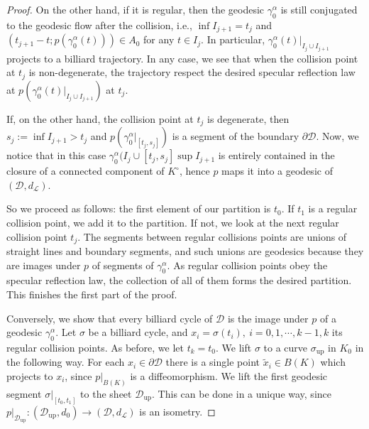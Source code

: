 \documentclass[reqno,11pt]{amsart}
\begin{document}
\begin{proof}
    On the other hand, if it is regular, then the geodesic \( \gamma^\alpha_0 \) is still conjugated to the geodesic flow after the collision, i.e., \(\inf I_{j+1} = t_j \) and \( (t_{j+1}-t; p(\gamma^\alpha_0(t))) \in A_0 \) for any \( t\in I_j \).
    In particular, \( \gamma^\alpha_0(t)\rvert_{I_j \cup I_{j+1}} \) projects to a billiard trajectory.
    In any case, we see that when the collision point at \(t_j\) is non-degenerate, the trajectory respect the desired specular reflection law at \( p(\gamma^\alpha_0(t)\rvert_{I_j \cup I_{j+1}}) \) at \(t_j\).
    \par If, on the other hand, the collision point at \(t_j\) is degenerate, then \(s_{j}:=\inf I_{j+1} > t_j \) and \(p(\gamma^\alpha_0\rvert_{[t_j, s_j]})\) is a segment of the boundary \( \partial \mathcal{D} \). 
    Now, we notice that in this case \(\gamma^\alpha_0(I_j \cup [t_j, s_j] \sup I_{j+1}\) is entirely contained in the closure of a connected component of \( K^\circ \), hence  \(p\) maps it into a geodesic of \( (\mathcal{D}, d_\mathcal{L}). \)   
    \par So we proceed as follows: the first element of our partition is \( t_0 \). 
    If \( t_1 \) is a regular collision point, we add it to the partition.
    If not, we look at the next regular collision point \( t_j \). 
    The segments between regular collisions points are unions of straight lines and boundary segments, and such unions are geodesics because they are images under \( p \) of segments of \( \gamma^\alpha_0 \). 
    As regular collision points obey the specular reflection law, the collection of all of them forms the desired partition.  
    This finishes the first part of the proof.
    \par Conversely, we show that every billiard cycle of \( \mathcal{D} \) is the image under \( p\) of a geodesic \( \gamma^\alpha_0 \).
    Let \( \sigma \) be a billiard cycle, and \( x_i = \sigma(t_i), \ i = 0, 1, \cdots, k-1, k \) its regular collision points.
    As before, we let \( t_k = t_0 \).
    We lift \( \sigma \) to a curve \( \sigma_\mathrm{up} \) in \( K_0 \) in the following way.
    For each \( x_i \in \partial\mathcal{D}\) there is a single point \( \widetilde x_i \in B(K) \) which projects to \( x_i \), since \( p\rvert_{B(K)} \) is a diffeomorphism.
    We lift the first geodesic segment \( \sigma\rvert_{[t_0, t_1]} \) to the sheet \( \mathcal{D}_\mathrm{up} \).
    This can be done in a unique way, since \( p\rvert_{\mathcal{D}_\mathrm{up}}: (\mathcal{D}_\mathrm{up}, d_0) \to (\mathcal{D}, d_\mathcal{L}) \) is an isometry.

\end{proof}
\end{document}
